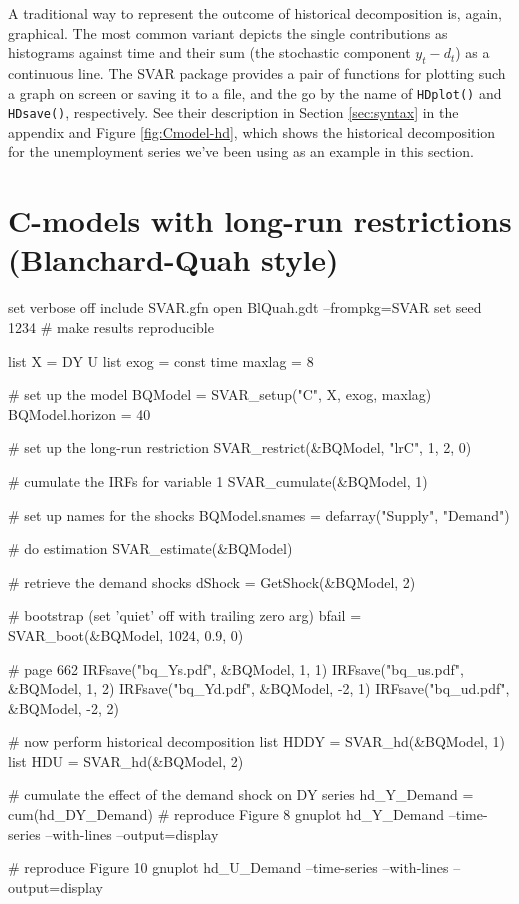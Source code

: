 \documentclass[a4paper,10pt]{article}
\newcommand{\cmd}[1]{\texttt{#1}}
\newcounter{script}[section]
\begin{document}
A traditional way to represent the outcome of historical decomposition
is, again, graphical. The most common variant depicts the single
contributions as histograms against time and their sum (the stochastic
component $y_t - d_t$) as a continuous line. The SVAR package provides
a pair of functions for plotting such a graph on screen or saving it
to a file, and the go by the name of \cmd{HDplot()} and
\cmd{HDsave()}, respectively. See their description in Section
\ref{sec:syntax} in the appendix and Figure \ref{fig:Cmodel-hd}, which
shows the historical decomposition for the unemployment series we've
been using as an example in this section.

\section{C-models with long-run restrictions (Blanchard-Quah style)}
\label{sec:BlQuah}

\begin{table}[htbp]
\begin{scode}
set verbose off
include SVAR.gfn
open BlQuah.gdt --frompkg=SVAR
set seed 1234 # make results reproducible

list X = DY U
list exog = const time
maxlag = 8

# set up the model
BQModel = SVAR_setup("C", X, exog, maxlag)
BQModel.horizon = 40

# set up the long-run restriction
SVAR_restrict(&BQModel, "lrC", 1, 2, 0)

# cumulate the IRFs for variable 1
SVAR_cumulate(&BQModel, 1)

# set up names for the shocks
BQModel.snames = defarray("Supply", "Demand")

# do estimation
SVAR_estimate(&BQModel)

# retrieve the demand shocks
dShock = GetShock(&BQModel, 2)

# bootstrap (set 'quiet' off with trailing zero arg)
bfail = SVAR_boot(&BQModel, 1024, 0.9, 0)

# page 662
IRFsave("bq_Ys.pdf", &BQModel,  1, 1)
IRFsave("bq_us.pdf", &BQModel,  1, 2)
IRFsave("bq_Yd.pdf", &BQModel, -2, 1)
IRFsave("bq_ud.pdf", &BQModel, -2, 2)

# now perform historical decomposition
list HDDY = SVAR_hd(&BQModel, 1)
list HDU  = SVAR_hd(&BQModel, 2)

# cumulate the effect of the demand shock on DY
series hd_Y_Demand = cum(hd_DY_Demand)
# reproduce Figure 8
gnuplot hd_Y_Demand --time-series --with-lines --output=display

# reproduce Figure 10
gnuplot hd_U_Demand --time-series --with-lines --output=display    

\end{scode}
  \caption{Blanchard-Quah example}
  \label{tab:BlQuah}
\end{table}
\end{document}

